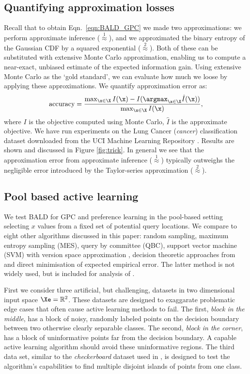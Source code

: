 \subsection{Quantifying approximation losses}

Recall that to obtain Eqn.\ \eqref{eqn:BALD_GPC} we made two approximations: we perform approximate inference ({\scriptsize $\stackrel{1}{\approx}$}), and we approximated the binary entropy of the Gaussian CDF by a squared exponential ({\scriptsize $\stackrel{2}{\approx}$}). Both of these can be substituted with extensive Monte Carlo approximation, enabling us to compute a near-exact, unbiased estimate of the expected information gain. Using extensive Monte Carlo as the `gold standard', we can evaluate how much we loose by applying these approximations. We quantify approximation error as: 
%
\begin{align}
	\mbox{accuracy} = \frac{ \max_{\x\in\X} I(\x) - I(\argmax_{\x\in\X}\hat{I}(\x)) }{{\max_{\x\in\X}I(\x) }},
\end{align}
%
where $I$ is the objective computed using Monte Carlo, $\hat{I}$ is the approximate objective. We have run experiments on the Lung Cancer (\emph{cancer}) classification dataset \citep{Hong1991} downloaded from the UCI Machine Learning Repository \citep{UCIRepository}. Results are shown and discussed in Figure \ref{fig:trick}. In general we see that the approximation error from approximate inference ({\scriptsize $\stackrel{1}{\approx}$}) typically outweighs the negligible error introduced by the Taylor-series approximation ({\scriptsize $\stackrel{2}{\approx}$}).

\subsection{Pool based active learning}

We test BALD for GPC and preference learning in the pool-based setting \ie selecting $x$ values from a fixed set of potential query locations. We compare to eight other algorithms discussed in this paper: random sampling, maximum entropy sampling (MES), query by committee (QBC), support vector machine (SVM) with version space approximation \cite{Tong2002}, decision theoretic approaches from \citep{Kapoor2007, Zhu2003} and direct minimisation of expected empirical error. The latter method is not widely used, but is included for analysis of \cite{Kapoor2007}.

First we consider three artificial, but challenging, datasets in two dimensional input space $\Xe = \mathbb{R}^2$. These datasets are designed to exaggarate problematic edge cases that often cause active learning methods to fail. The first, \emph{block in the middle}, has a block of noisy, randomly labeled points on the decision boundary between two otherwise clearly separable classes. The second, \emph{block in the corner}, has a block of uninformative points far from the decision boundary. A capable active learning algorithm should avoid these uninformative regions. The third data set, similar to the \emph{checkerboard} dataset used in \cite{Zhu2003}, is designed to test the algorithm's capabilities to find multiple disjoint islands of points from one class. 

